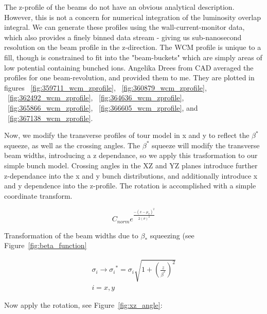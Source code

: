 The z-profile of the beams do not have an obvious analytical description.
However, this is not a concern for numerical integration of the luminosity
overlap integral. We can generate these profiles using the wall-current-monitor
data, which also provides a finely binned data stream - giving us sub-nanosecond
resolution on the beam profile in the z-direction. The WCM profile is unique to
a fill, though is constrained to fit into the "beam-buckets" which are simply
areas of low potential containing bunched ions. Angelika Drees from CAD
averaged the profiles for one beam-revolution, and provided them to me. They
are plotted in figures ~\ref{fig:359711_wcm_zprofile},
~\ref{fig:360879_wcm_zprofile}, ~\ref{fig:362492_wcm_zprofile},
~\ref{fig:364636_wcm_zprofile}, ~\ref{fig:365866_wcm_zprofile},
~\ref{fig:366605_wcm_zprofile}, and ~\ref{fig:367138_wcm_zprofile}.

Now, we modify the transverse profiles of tour model in x and y to reflect the
$\beta^{*}$ squeeze, as well as the crossing angles. The $\beta^{*}$ squeeze
will modify the transverse beam widths, introducing a z dependance, so we apply
this trasformation to our simple bunch model. Crossing angles in the XZ and YZ
planes introduce further z-dependance into the x and y bunch distributions, and
additionally introduce x and y dependence into the z-profile. The rotation is
accomplished with a simple coordinate transform.

\begin{equation}
\label{eq:realistic_transverse_density}
C_{norm}{e}^{\frac{-{\left(x-\mu_{x}\right)}^2}{2{\left(\sigma\right)}^2}}
\end{equation}

Transformation of the beam widths due to $\beta_{*}$ squeezing (see
Figure~\ref{fig:beta_function}

\begin{gather}
\label{eq:beta_star_transform}
\sigma_{i} \rightarrow {{\sigma}_{i}}^{*} =
\sigma_{i}\sqrt{1+{\left(\frac{z}{\beta^{*}} \right)}^{2} } \\
i = x, y
\end{gather}


Now apply the rotation, see Figure~\ref{fig:xz_angle}:

